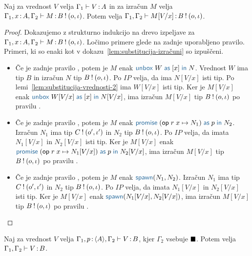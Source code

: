 \begin{lema}\label{lem:substitucija-izračuni-2}
	Naj za vrednost $V$ velja $\Gamma_1 \vdash V \mathinner{:} A$ in za izračun $M$ velja $\Gamma_1, x \mathinner{:} A, \Gamma_2 \vdash M \mathinner{:} B \mathbin{!} (o, \iota)$. Potem velja $\Gamma_1, \Gamma_2 \vdash M[V/x] \mathinner{:} B \mathbin{!} (o, \iota)$.
\end{lema}

\begin{proof}
	Dokazujemo z strukturno indukcijo na drevo izpeljave za $\Gamma_1, x \mathinner{:} A, \Gamma_2 \vdash M \mathinner{:} B \mathbin{!} (o, \iota)$.
	Ločimo primere glede na zadnje uporabljeno pravilo.
	Primeri, ki so enaki kot v dokazu~\ref{lem:substitucija-izračuni} so izpuščeni.
	
	\begin{itemize}
		\item Če je zadnje pravilo , potem je $M$ enak $\tmunbox{W}{x}{N}$. Vrednost $W$ ima tip $B$ in izračun $N$ tip $B \mathbin{!} (o, \iota)$.
		Po $IP$ velja, da ima $N[V/x]$ isti tip. Po lemi~\ref{lem:substitucija-vrednosti-2} ima $W[V/x]$ isti tip. Ker je $M[V/x]$ enak $\tmunbox{W[V/x]}{x}{N[V/x]}$, ima izračun $M[V/x]$ tip $B \mathbin{!} (o, \iota)$ po pravilu .
		
		\item Če je zadnje pravilo , potem je $M$ enak $\tmwithrec{op}{r}{x}{N_1}{p}{N_2}$. Izračun $N_1$ ima tip $C \mathbin{!} (o', \iota')$ in $N_2$ tip $B \mathbin{!} (o, \iota)$.
		Po $IP$ velja, da imata $N_1[V/x]$ in $N_2[V/x]$ isti tip. Ker je $M[V/x]$ enak $\tmwithrec{op}{r}{x}{N_1[V/x]}{p}{N_2[V/x]}$, ima izračun $M[V/x]$ tip $B \mathbin{!} (o, \iota)$ po pravilu .
		
		\item Če je zadnje pravilo , potem je $M$ enak $\tmspawn{N_1}{N_2}$. Izračun $N_1$ ima tip $C \mathbin{!} (o', \iota')$ in $N_2$ tip $B \mathbin{!} (o, \iota)$.
		Po $IP$ velja, da imata $N_1[V/x]$ in $N_2[V/x]$ isti tip. Ker je $M[V/x]$ enak $\tmspawn{N_1[V/x]}{N_2[V/x]}$, ima izračun $M[V/x]$ tip $B \mathbin{!} (o, \iota)$ po pravilu .	
	\end{itemize}
	
\end{proof}


\begin{lema}\label{lem:strengthening-values-bb}
	Naj za vrednost $V$ velja $\Gamma_1, p \mathinner{:} \langle A \rangle, \Gamma_2 \vdash V \mathinner{:} B$, kjer $\Gamma_2$ vsebuje $\blacksquare$. Potem velja $\Gamma_1, \Gamma_2 \vdash V \mathinner{:} B$.
\end{lema}

